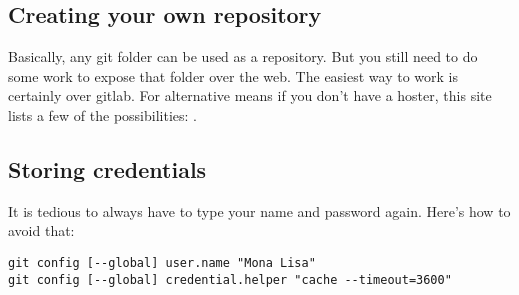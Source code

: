 \subsection{Creating your own repository}
Basically, any git folder can be used as a repository. But you still need to do some work to expose that folder over the web. The easiest way to work is certainly over gitlab. For alternative means if you don't have a hoster, this site lists a few of the possibilities: .



\subsection{Storing credentials}
It is tedious to always have to type your name and password again. Here's how to avoid that: 
\begin{lstlisting}
git config [--global] user.name "Mona Lisa"
git config [--global] credential.helper "cache --timeout=3600"
\end{lstlisting}
